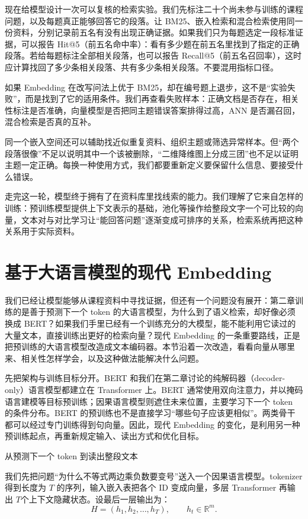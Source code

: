 现在给模型设计一次可以复核的检索实验。我们先标注二十个尚未参与训练的课程问题，以及每题真正能够回答它的段落。让 BM25、嵌入检索和混合检索使用同一份资料，分别记录前五名有没有出现正确证据。如果我们只为每题选定一段标准证据，可以报告 Hit@5（前五名命中率）：看有多少题在前五名里找到了指定的正确段落。若给每题标注全部相关段落，也可以报告 Recall@5（前五名召回率），这时应计算找回了多少条相关段落、共有多少条相关段落。不要混用指标口径。

如果 Embedding 在改写问法上优于 BM25，却在编号题上退步，这不是``实验失败''，而是找到了它的适用条件。我们再查看失败样本：正确文档是否存在，相关性标注是否准确，向量模型是否把同主题错误答案排得过高，ANN 是否漏召回，混合检索是否真的互补。

同一个嵌入空间还可以辅助找近似重复资料、组织主题或筛选异常样本。但``两个段落很像''不足以说明其中一个该被删除，``二维降维图上分成三团''也不足以证明主题一定正确。每换一种使用方式，我们都要重新定义要保留什么信息、要接受什么错误。

走完这一轮，模型终于拥有了在资料库里找线索的能力。我们理解了它来自怎样的训练：预训练模型提供上下文表示的基础，池化等操作给整段文字一个可比较的向量，文本对与对比学习让``能回答问题''逐渐变成可排序的关系，检索系统再把这种关系用于实际资料。

\section{基于大语言模型的现代 Embedding}

我们已经让模型能够从课程资料中寻找证据，但还有一个问题没有展开：第二章训练的是善于预测下一个 token 的大语言模型，为什么到了语义检索，却好像必须换成 BERT？如果我们手里已经有一个训练充分的大模型，能不能利用它读过的大量文本，直接训练出更好的检索向量？现代 Embedding 的一条重要路线，正是把预训练的大语言模型改造成文本编码器。本节沿着一次改造，看看向量从哪里来、相关性怎样学会，以及这种做法能解决什么问题。

先把架构与训练目标分开。BERT 和我们在第二章讨论的纯解码器（decoder-only）语言模型都建立在 Transformer 上。BERT 通常使用双向注意力，并以掩码语言建模等目标预训练；因果语言模型则遮住未来位置，主要学习下一个 token 的条件分布。BERT 的预训练也不是直接学习``哪些句子应该更相似''。两类骨干都可以经过专门训练得到句向量。因此，现代 Embedding 的变化，是利用另一种预训练起点，再重新规定输入、读出方式和优化目标。

从预测下一个 token 到读出整段文本

我们先把问题``为什么不等式两边乘负数要变号''送入一个因果语言模型。tokenizer 得到长度为 \(T\) 的序列，输入嵌入表把各个 ID 变成向量，多层 Transformer 再输出 \(T\)个上下文隐藏状态。设最后一层输出为：
\[H = \left( h_{1},h_{2},\ldots,h_{T} \right),\quad\quad h_{t} \in \mathbb{R}^{m}.\]

